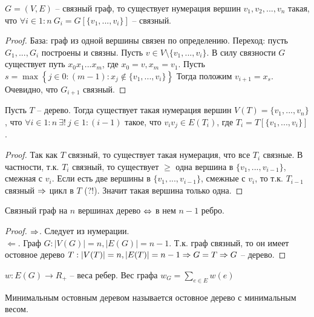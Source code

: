 	\begin{Prop}
		$G = (V, E)$ -- связный граф, то существует нумерация вершин $v_1, v_2, ..., v_n$ такая, что $\forall i \in 1:n \ G_i = G[\{v_1, ..., v_i\}]$ -- связный.
	\end{Prop}

	\begin{proof}
		База: граф из одной вершины связен по определению. 
		Переход: пусть $G_1, ..., G_i$ построены и связны. Пусть $v \in V \setminus \{v_1, ..., v_i\}$.
		В силу связности $G$ существует путь $x_0 x_1 ... x_m$, где $x_0 = v, x_m = v_1$.
		Пусть $s = \max \left\{j \in 0:(m - 1) : x_j \notin\{v_1, ..., v_i\} \right\}$ 
		Тогда положим $v_{i + 1} = x_s$. Очевидно, что $G_{i + 1}$ связный. 
	\end{proof}

	\begin{Prop}
		Пусть $T$ -- дерево. Тогда существует такая нумерация вершин $V(T) = \{v_1, ..., v_n\}$, что $\forall i \in 1 : n \ \exists ! \ j \in 1 : (i - 1)$ такое,
		что $v_i v_j \in E(T_i)$, где $T_i = T\left[\{v_1, ..., v_i\}\right]$.
	\end{Prop}

	\begin{proof}
		Так как $T$ связный, то существует такая нумерация, что все $T_i$ связные.
		В частности, т.к. $T_i$ связный, то существует $\geqslant$ одна вершина в $\{v_1, ..., v_{i - 1}\}$, смежная с $v_i$.
		Если есть две вершины в $\{v_1, ..., v_{i - 1}\}$, смежные с $v_i$, то т.к. $T_{i - 1}$ связный $\Rightarrow$ цикл в $T$ (?!).
		Значит такая вершина только одна. 
	\end{proof}

	\begin{Prop}
		Связный граф на $n$ вершинах дерево $\Leftrightarrow$ в нем $n - 1$ ребро.
	\end{Prop}

	\begin{proof}
		$\Rightarrow$. Следует из нумерации. \\
		$\Leftarrow$. Граф $G : |V(G)| = n, |E(G)| = n - 1$. Т.к. граф связный, то он имеет остовное дерево $T : |V(T)| = n, |E(T)| = n - 1 \Rightarrow G = T \Rightarrow G$ -- дерево.  
	\end{proof}

	\begin{notation}
		$w : E(G) \to R_+$ -- веса ребер. Вес графа $w_G = \sum_{e \in E} w(e)$ 
	\end{notation}

	\begin{Def}
		Минимальным остовным деревом называется остовное дерево с минимальным весом.
	\end{Def}

